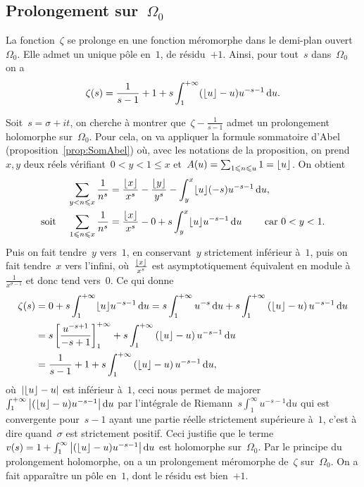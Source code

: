 	\subsection{Prolongement sur~$\Omega_0$}
	\unboldmath
		\begin{prop}\label{prop:P5}
			La fonction~$\zeta$ se prolonge en une fonction méromorphe dans le demi-plan ouvert~$\Omega_0$. Elle admet un unique pôle en~$1$, de résidu~$+1$. Ainsi, pour tout~$s$ dans~$\Omega_0$ on a
			\[
				\zeta(s) = \frac{1}{s-1} + 1 + s\int_{1}^{+\infty} (\lfloor u\rfloor-u)u^{-s-1}\,\mathrm{d}u.
			\]
		\end{prop}
		\begin{dem}
			Soit~$s=\sigma+it$, on cherche à montrer que~$\zeta-\frac{1}{s-1}$ admet un prolongement holomorphe sur~$\Omega_0$. Pour cela, on va appliquer la formule sommatoire d'Abel (proposition~\ref{prop:SomAbel}) où, avec les notations de la proposition, on prend~$x,y$ deux réels vérifiant~$0<y<1\leq x$ et~$A(u)=\sum_{1\leqslant n\leqslant u} 1 =\lfloor u\rfloor$. On obtient 
			\begin{align*}
				&&\displaystyle\sum_{y<n\leqslant x} \dfrac{1}{n^s} 		& =  \dfrac{\lfloor x\rfloor}{x^s}- 	\dfrac{\lfloor y\rfloor}{y^s}-\displaystyle\int_y^x \lfloor u\rfloor(-s)u^{-s-1}\,\mathrm{d}u,	\\
				\text{soit }&&
				\displaystyle\sum_{1\leqslant n\leqslant x} \dfrac{1}{n^s} 	& = \dfrac{\lfloor x\rfloor}{x^s} -0+s\displaystyle\int_y^x \lfloor u\rfloor u^{-s-1}\,\mathrm{d}u	
				\quad\quad\text{ car } 0 < y < 1.
			\end{align*}
			Puis on fait tendre~$y$ vers~$1$, en conservant~$y$ strictement inférieur à~$1$, puis on fait tendre~$x$ vers l'infini, où~$\frac{\lfloor x\rfloor}{x^s}$ est asymptotiquement équivalent en module à~$\frac{1}{x^{\sigma-1}}$ et donc tend vers~$0$. Ce qui donne
			\begin{align*}
				\zeta(s)& = 0 + s\int_1^{+\infty}\lfloor u\rfloor u^{-s-1}\,\mathrm{d}u	
						  =  s\int_1^{+\infty} u^{-s}\,\mathrm{d}u + s\int_1^{+\infty} \left(\lfloor u\rfloor-u\right)u^{-s-1}\,\mathrm{d}u	\\
						& = s\left[\frac{u^{-s+1}}{-s+1}\right]_1^{+\infty}+s\int_1^{+\infty} \left(\lfloor u\rfloor-u\right)u^{-s-1}\,\mathrm{d}u 	\\
						& =  \frac{1}{s-1}+
						1+s\int_1^{+\infty} \left(\lfloor u\rfloor-u\right)u^{-s-1}\,\mathrm{d}u,	
			\end{align*}
			où~$\left\vert \lfloor u\rfloor-u\right\vert$ est inférieur à~$1$, ceci nous permet de majorer~$\int_1^{+\infty} \left\vert (\lfloor u\rfloor-u)u^{-s-1}\right\vert\mathrm{d}u$ par l'intégrale de Riemann~$s\int_1^{\infty} u^{-s-1}\mathrm{d}u$ qui est convergente pour~$s-1$ ayant une partie réelle strictement supérieure à~$1$, c'est à dire quand~$\sigma$ est strictement positif. Ceci justifie que le terme~$v(s)=1+\int_{1}^{\infty}\left\vert (\lfloor u\rfloor-u)u^{-s-1}\right\vert\mathrm{d}u$ est holomorphe sur~$\Omega_0$. Par le principe du prolongement holomorphe, on a un prolongement méromorphe de~$\zeta$ sur~$\Omega_0$. On a fait apparaître un pôle en~$1$, dont le résidu est bien~$+1$.
		\end{dem}
